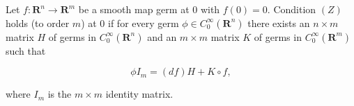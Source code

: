 Let $f: \mathbf{R}^n \to \mathbf{R}^m$ be a smooth map germ at $0$ with $f(0) = 0$. Condition $(Z)$ holds (to order $m$) at $0$ if for every germ $\phi \in C_0^\infty(\mathbf{R}^n)$ there exists an $n \times m$ matrix $H$ of germs in $C_0^\infty(\mathbf{R}^n)$ and an $m \times m$ matrix $K$ of germs in $C_0^\infty(\mathbf{R}^m)$ such that

$$\phi I_m = (df)H + K \circ f,$$

where $I_m$ is the $m \times m$ identity matrix.
